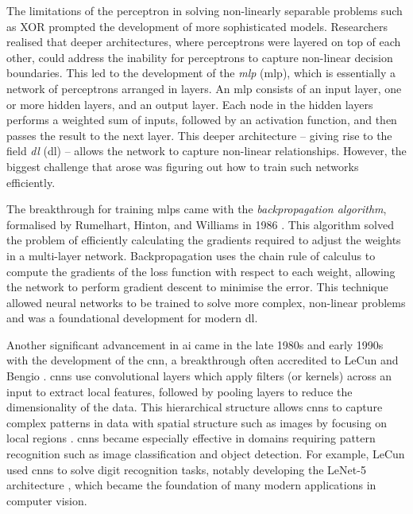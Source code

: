 The limitations of the perceptron in solving non-linearly separable problems such as XOR prompted the development of more sophisticated models. Researchers realised that deeper architectures, where perceptrons were layered on top of each other, could address the inability for perceptrons to capture non-linear decision boundaries. This led to the development of the \textit{\acrlong{mlp}} (\acrshort{mlp}), which is essentially a network of perceptrons arranged in layers. An \acrshort{mlp} consists of an input layer, one or more hidden layers, and an output layer. Each node in the hidden layers performs a weighted sum of inputs, followed by an activation function, and then passes the result to the next layer. This deeper architecture -- giving rise to the field \textit{\acrlong{dl}} (\acrshort{dl}) -- allows the network to capture non-linear relationships. However, the biggest challenge that arose was figuring out how to train such networks efficiently.

The breakthrough for training \acrshort{mlp}s came with the \textit{backpropagation algorithm}, formalised by Rumelhart, Hinton, and Williams in 1986 \cite{rumelhart_learning_1986}. This algorithm solved the problem of efficiently calculating the gradients required to adjust the weights in a multi-layer network. Backpropagation uses the chain rule of calculus to compute the gradients of the loss function with respect to each weight, allowing the network to perform gradient descent to minimise the error. This technique allowed neural networks to be trained to solve more complex, non-linear problems and was a foundational development for modern \acrlong{dl}.

Another significant advancement in \acrlong{ai} came in the late 1980s and early 1990s with the development of the \acrfull{cnn}, a breakthrough often accredited to LeCun and Bengio \cite{lecun_backpropagation_1989, lecun_convolutional_1995}. \acrshort{cnn}s use convolutional layers which apply filters (or kernels) across an input to extract local features, followed by pooling layers to reduce the dimensionality of the data. This hierarchical structure allows \acrshort{cnn}s to capture complex patterns in data with spatial structure such as images by focusing on local regions \cite[Ch. 9]{goodfellow_deep_2016}. \acrshort{cnn}s became especially effective in domains requiring pattern recognition such as image classification and object detection. For example, LeCun used \acrshort{cnn}s to solve digit recognition tasks, notably developing the LeNet-5 architecture \cite{lecun_gradient-based_1998}, which became the foundation of many modern applications in computer vision.

